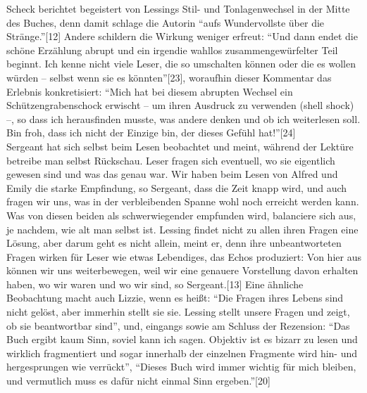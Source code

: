 \documentclass[fontsize=12pt]{scrartcl}
\begin{document}
Scheck berichtet begeistert von Lessings Stil- und Tonlagenwechsel in der Mitte des Buches, denn damit schlage die Autorin "`aufs Wundervollste \"uber die Str\"ange."'[12] Andere schildern die Wirkung weniger erfreut: "`Und dann endet die sch\"one Erz\"ah\-lung abrupt und ein irgendie wahllos zusammengew\"urfelter Teil beginnt. Ich kenne nicht viele Leser, die so umschalten k\"onnen oder die es wollen w\"urden -- \mbox{selbst} wenn sie es k\"onnten"'[23], woraufhin dieser Kommentar das Erlebnis konkretisiert: "`Mich hat bei diesem abrupten Wechsel ein Sch\"utzengrabenschock erwischt -- um ihren Ausdruck zu verwenden (shell shock) --, so dass ich he\-rausfinden musste, was andere denken und ob ich weiterlesen soll. Bin froh, dass ich nicht der Einzige bin, der dieses Gef\"uhl hat!"'[24]\\
Sergeant hat sich \mbox{selbst} beim Lesen beobachtet und meint, w\"ahrend der Lekt\"ure betreibe man \mbox{selbst} R\"uckschau. Leser fragen sich eventuell, wo sie eigentlich gewesen sind und was das genau war. Wir haben beim Lesen von Alfred und Emily die starke Empfindung, so Sergeant, dass die Zeit knapp wird, und auch fragen wir uns, was in der verbleibenden Spanne wohl noch erreicht werden kann. Was von diesen beiden als schwerwiegender empfunden wird, balanciere sich aus, je nachdem, wie alt man \mbox{selbst} ist. Lessing findet nicht zu allen ihren Fragen eine L\"osung, aber darum geht es nicht allein, meint er, denn ihre unbeantworteten Fragen wirken f\"ur Leser wie etwas Lebendiges, das Echos produziert: Von \mbox{hier} aus k\"onnen wir uns weiterbewegen, weil wir eine genauere Vorstellung davon erhalten haben, wo wir waren und wo wir sind, so Sergeant.[13] Eine \"ahnliche Beobachtung macht auch Lizzie, wenn es hei{\ss}t: "`Die Fragen ihres Lebens sind nicht gel\"ost, aber immerhin stellt sie sie. Lessing stellt unsere Fragen und zeigt, ob sie beantwortbar sind"', und, eingangs sowie am Schluss der Rezension: "`Das Buch ergibt kaum Sinn, soviel kann ich sagen. Objektiv ist es bizarr zu lesen und wirklich fragmentiert und sogar innerhalb der einzelnen Fragmente wird hin- und hergesprungen wie verr\"uckt"', "`Dieses Buch wird immer wichtig f\"ur mich bleiben, und vermutlich muss es daf\"ur nicht einmal Sinn ergeben."'[20]
\end{document}
